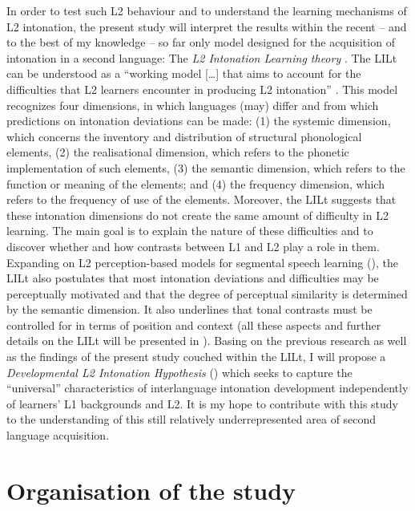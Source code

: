 In order to test such L2 behaviour and to understand the learning mechanisms of L2 intonation, the present study will interpret the results within the recent -- and to the best of my knowledge -- so far only model designed for the acquisition of intonation in a second language: The \textit{L2 Intonation Learning theory} \citep{Mennen2015}. The LILt can be understood as a “working model […] that aims to account for the difficulties that L2 learners encounter in producing L2 intonation” \citep[171]{Mennen2015}. This model recognizes four dimensions, in which languages (may) differ and from which predictions on intonation deviations can be made: (1) the systemic dimension, which concerns the inventory and distribution of structural phonological elements, (2) the realisational dimension, which refers to the phonetic implementation of such elements, (3) the semantic dimension, which refers to the function or meaning of the elements; and (4) the frequency dimension, which refers to the frequency of use of the elements. Moreover, the LILt suggests that these intonation dimensions do not create the same amount of difficulty in L2 learning. The main goal is to explain the nature of these difficulties and to discover whether and how contrasts between L1 and L2 play a role in them. Expanding on L2 perception-based models for segmental speech learning (), the LILt also postulates that most intonation deviations and difficulties may be perceptually motivated and that the degree of perceptual similarity is determined by the semantic dimension. It also underlines that tonal contrasts must be controlled for in terms of position and context (all these aspects and further details on the LILt will be presented in ). Basing on the previous research as well as the findings of the present study couched within the LILt, I will propose a \textit{Developmental L2 Intonation Hypothesis} () which seeks to capture the “universal” characteristics of interlanguage intonation development independently of learners’ L1 backgrounds and L2. It is my hope to contribute with this study to the understanding of this still relatively underrepresented area of second language acquisition.

\section{Organisation of the study}\label{sec:1.5}  %

